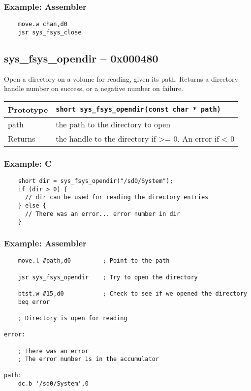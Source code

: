 \subsubsection*{Example: Assembler}
\begin{verbatim}
    move.w chan,d0
    jsr sys_fsys_close
\end{verbatim}


\subsection*{sys\_fsys\_opendir -- 0x000480}
Open a directory on a volume for reading, given its path.
Returns a directory handle number on success, or a negative number on failure.

\bigskip

\begin{tabular}{|l||l|} \hline
Prototype & \lstinline!short sys_fsys_opendir(const char * path)! \\ \hline
path & the path to the directory to open \\ \hline
Returns & the handle to the directory if >= 0. An error if < 0 \\ \hline
\end{tabular}

\subsubsection*{Example: C}
\begin{lstlisting}
    short dir = sys_fsys_opendir("/sd0/System");
    if (dir > 0) {
      // dir can be used for reading the directory entries
    } else {
      // There was an error... error number in dir
    }    
\end{lstlisting}

\subsubsection*{Example: Assembler}
\begin{verbatim}
	move.l #path,d0         ; Point to the path

    jsr sys_fsys_opendir    ; Try to open the directory

    btst.w #15,d0           ; Check to see if we opened the directory
    beq error

    ; Directory is open for reading

error:

    ; There was an error
    ; The error number is in the accumulator

path:
    dc.b '/sd0/System',0
\end{verbatim}


